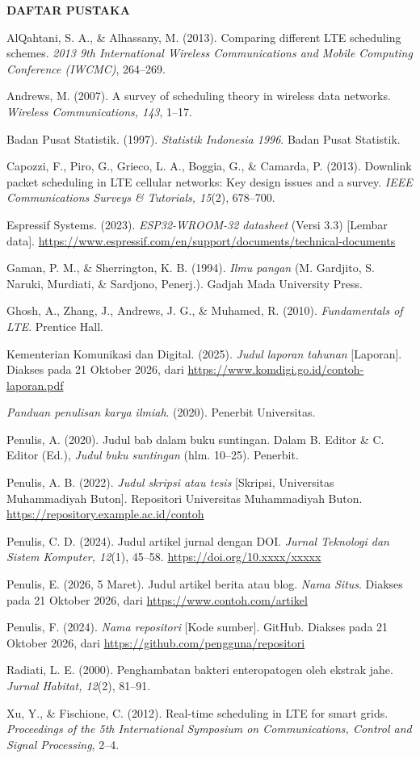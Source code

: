 \begin{tengah}
\textbf{DAFTAR PUSTAKA}
\end{tengah}
\begin{pustaka}
AlQahtani, S. A., \& Alhassany, M. (2013). Comparing different LTE scheduling schemes. \textit{2013 9th International Wireless Communications and Mobile Computing Conference (IWCMC)}, 264--269.

Andrews, M. (2007). A survey of scheduling theory in wireless data networks. \textit{Wireless Communications, 143}, 1--17.

Badan Pusat Statistik. (1997). \textit{Statistik Indonesia 1996}. Badan Pusat Statistik.

Capozzi, F., Piro, G., Grieco, L. A., Boggia, G., \& Camarda, P. (2013). Downlink packet scheduling in LTE cellular networks: Key design issues and a survey. \textit{IEEE Communications Surveys \& Tutorials, 15}(2), 678--700.

Espressif Systems. (2023). \textit{ESP32-WROOM-32 datasheet} (Versi 3.3) [Lembar data]. \url{https://www.espressif.com/en/support/documents/technical-documents}

Gaman, P. M., \& Sherrington, K. B. (1994). \textit{Ilmu pangan} (M. Gardjito, S. Naruki, Murdiati, \& Sardjono, Penerj.). Gadjah Mada University Press.

Ghosh, A., Zhang, J., Andrews, J. G., \& Muhamed, R. (2010). \textit{Fundamentals of LTE}. Prentice Hall.

Kementerian Komunikasi dan Digital. (2025). \textit{Judul laporan tahunan} [Laporan]. Diakses pada 21 Oktober 2026, dari \url{https://www.komdigi.go.id/contoh-laporan.pdf}

\textit{Panduan penulisan karya ilmiah}. (2020). Penerbit Universitas.

Penulis, A. (2020). Judul bab dalam buku suntingan. Dalam B. Editor \& C. Editor (Ed.), \textit{Judul buku suntingan} (hlm. 10--25). Penerbit.

Penulis, A. B. (2022). \textit{Judul skripsi atau tesis} [Skripsi, Universitas Muhammadiyah Buton]. Repositori Universitas Muhammadiyah Buton. \url{https://repository.example.ac.id/contoh}

Penulis, C. D. (2024). Judul artikel jurnal dengan DOI. \textit{Jurnal Teknologi dan Sistem Komputer, 12}(1), 45--58. \url{https://doi.org/10.xxxx/xxxxx}

Penulis, E. (2026, 5 Maret). Judul artikel berita atau blog. \textit{Nama Situs}. Diakses pada 21 Oktober 2026, dari \url{https://www.contoh.com/artikel}

Penulis, F. (2024). \textit{Nama repositori} [Kode sumber]. GitHub. Diakses pada 21 Oktober 2026, dari \url{https://github.com/pengguna/repositori}

Radiati, L. E. (2000). Penghambatan bakteri enteropatogen oleh ekstrak jahe. \textit{Jurnal Habitat, 12}(2), 81--91.

Xu, Y., \& Fischione, C. (2012). Real-time scheduling in LTE for smart grids. \textit{Proceedings of the 5th International Symposium on Communications, Control and Signal Processing}, 2--4.
\end{pustaka}


